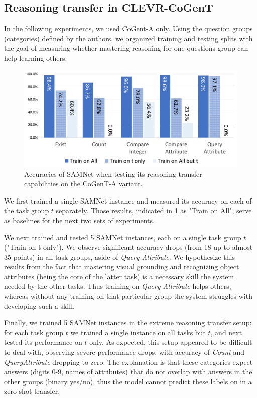 \subsection{Reasoning transfer in CLEVR-CoGenT}
\label{sec:reasoning-transfer-clevr}
In the following experiments, we used CoGent-A only.
Using the question groups (categories) defined by the authors, we organized training and testing splits with the goal of measuring whether mastering reasoning for one questions group can help learning others.

\begin{figure}[htbp]
	\centering
	\includegraphics[width=\columnwidth]{../img/plots/cogent_reasoning_transfer.pdf}
	\caption{Accuracies of SAMNet when testing its reasoning transfer capabilities on the CoGenT-A variant.}
	\label{fig:cogent_reasoning_transfer}
\end{figure}

We first trained a single SAMNet instance and measured its accuracy on each of the task group $t$ separately.
Those results, indicated in \cref{fig:cogent_reasoning_transfer} as "Train on All", serve as baselines for the next two sets of experiments.

We next trained and tested 5 SAMNet instances, each on a single task group $t$ ("Train on t only").
We observe significant accuracy drops (from 18 up to almost 35 points) in all task groups, aside of \textit{Query Attribute}.
We hypothesize this results from the fact that mastering visual grounding and recognizing object attributes (being the core of the latter task) is a necessary skill the system needed by the other tasks.
Thus training on \textit{Query Attribute} helps others, whereas without any training on that particular group the system struggles with developing such a skill.

Finally, we trained 5 SAMNet instances in the extreme reasoning transfer setup: for each task group $t$ we trained a single instance on all tasks but $t$, and next tested its performance on $t$ only.
As expected, this setup appeared to be difficult to deal with, observing severe performance drops, with accuracy of \textit{Count} and \textit{QueryAttribute} dropping to zero.
The explanation is that these categories expect  answers (digits 0-9, names of attributes) that do not overlap with answers in the other groups (binary yes/no), thus the model cannot predict these labels on in a zero-shot transfer.

